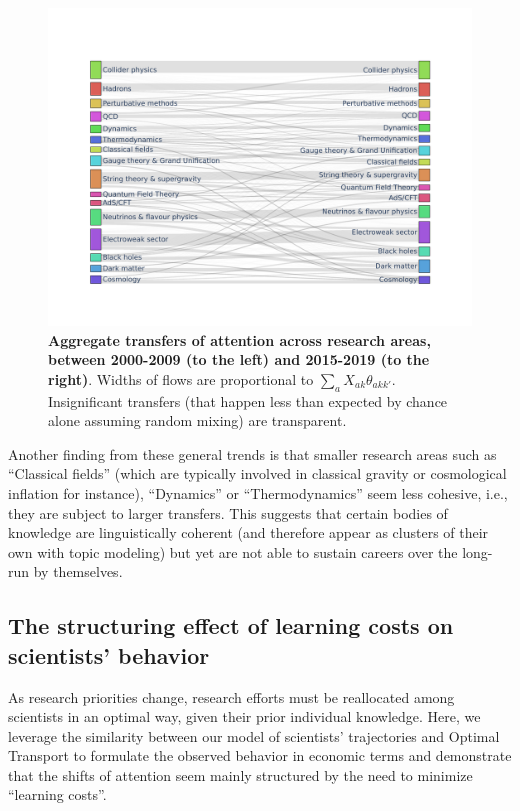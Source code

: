 \documentclass{article}
\begin{document}
 \begin{figure}[h]
     \centering
     \includegraphics[width=\textwidth]{plots/sankey_control_nu.pdf}
     \caption{\textbf{Aggregate transfers of attention across research areas, between 2000-2009 (to the left) and 2015-2019 (to the right)}. Widths of flows are proportional to $\sum_a X_{ak}\theta_{akk'}$. Insignificant transfers (that happen less than expected by chance alone assuming random mixing) are transparent. }
     \label{fig:sankey}
 \end{figure}

Another finding from these general trends is that smaller research areas such as ``Classical fields'' (which are typically involved in classical gravity or cosmological inflation for instance), ``Dynamics'' or ``Thermodynamics'' seem less cohesive, i.e., they are subject to larger transfers. This suggests that certain bodies of knowledge are linguistically coherent (and therefore appear as clusters of their own with topic modeling) but yet are not able to sustain careers over the long-run by themselves.

\subsection{\label{sec:optimal-transport}The structuring effect of learning costs on scientists' behavior}

As research priorities change, research efforts must be reallocated among scientists in an optimal way, given their prior individual knowledge. Here, we leverage the similarity between our model of scientists' trajectories and Optimal Transport \citep{muzellec2017tsallis,li2019learning} to formulate the observed behavior in economic terms and demonstrate that the shifts of attention seem mainly structured by the need to minimize ``learning costs''. 
\end{document}

